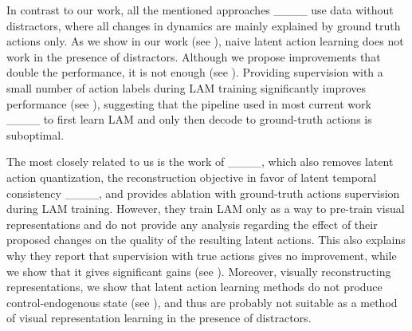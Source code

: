 In contrast to our work, all the mentioned approaches ____ use data without distractors, where all changes in dynamics are mainly explained by ground truth actions only. As we show in our work (see ), naive latent action learning does not work in the presence of distractors. Although we propose improvements that double the performance, it is not enough (see ). Providing supervision with a small number of action labels during LAM training significantly improves performance (see ), suggesting that the pipeline used in most current work ____ to first learn LAM and only then decode to ground-truth actions is suboptimal. 

The most closely related to us is the work of ____, which also removes latent action quantization, the reconstruction objective in favor of latent temporal consistency ____, and provides ablation with ground-truth actions supervision during LAM training. However, they train LAM only as a way to pre-train visual representations and do not provide any analysis regarding the effect of their proposed changes on the quality of the resulting latent actions. This also explains why they report that supervision with true actions gives no improvement, while we show that it gives significant gains (see ). Moreover, visually reconstructing representations, we show that latent action learning methods do not produce control-endogenous state (see ), and thus are probably not suitable as a method of visual representation learning in the presence of distractors.